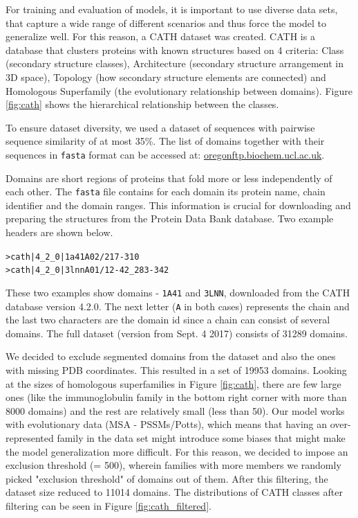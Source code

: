 For training and evaluation of models, it is important to use diverse data sets, that capture a wide range of different scenarios and thus force the model to generalize well. For this reason, a CATH dataset was created.
CATH is a database that clusters proteins with known structures based on 4 criteria: Class (secondary structure classes), Architecture (secondary structure arrangement in 3D space), Topology (how secondary structure elements are connected) and Homologous Superfamily (the evolutionary relationship between domains). 
Figure \ref{fig:cath} shows the hierarchical relationship between the classes.
    
To ensure dataset diversity, we used a dataset of sequences with pairwise sequence similarity of at most 35\%. 
The list of domains together with their sequences in \texttt{fasta} format can be accessed at: \href{ftp://orengoftp.biochem.ucl.ac.uk/cath/releases/latest-release/sequence-data/cath-domain-seqs-S35.fa}{oregonftp.biochem.ucl.ac.uk}.

Domains are short regions of proteins that fold more or less independently of each other. 
The \texttt{fasta} file contains for each domain its protein name, chain identifier and the domain ranges. 
This information is crucial for downloading and preparing the structures from the Protein Data Bank database. 
Two example headers are shown below. 
    
\begin{center}
    \texttt{>cath|4\_2\_0|1a41A02/217-310}\\
    \texttt{>cath|4\_2\_0|3lnnA01/12-42\_283-342}
\end{center}
    
These two examples show domains - \texttt{1A41} and \texttt{3LNN}, downloaded from the CATH database version 4.2.0. 
The next letter (\texttt{A} in both cases) represents the chain and the last two characters are the domain id since a chain can consist of several domains. 
The full dataset (version from Sept. 4 2017) consists of 31289 domains. 
    
We decided to exclude segmented domains from the dataset and also the ones with missing PDB coordinates. 
This resulted in a set of 19953 domains. 
Looking at the sizes of homologous superfamilies in Figure \ref{fig:cath}, there are few large ones (like the immunoglobulin family in the bottom right corner with more than 8000 domains) and the rest are relatively small (less than 50). 
Our model works with evolutionary data (MSA - PSSMs/Potts), which means that having an over-represented family in the data set might introduce some biases that might make the model generalization more difficult. 
For this reason, we decided to impose an exclusion threshold (= 500), wherein families with more members we randomly picked "exclusion threshold" of domains out of them. 
After this filtering, the dataset size reduced to 11014 domains.
The distributions of CATH classes after filtering can be seen in Figure \ref{fig:cath_filtered}.
    
